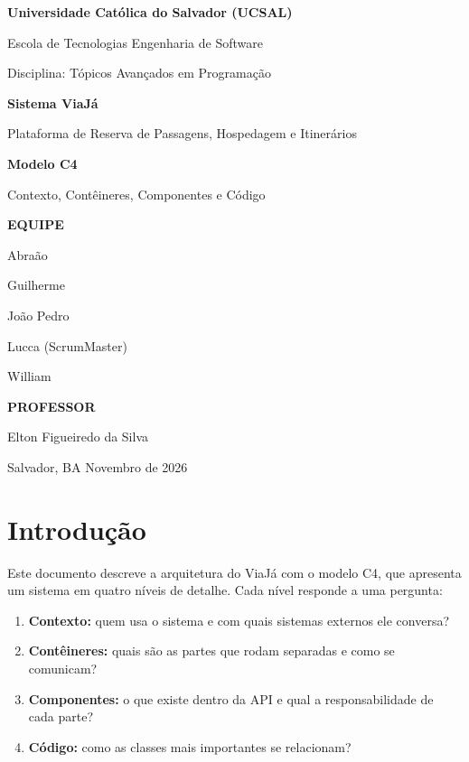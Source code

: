 \documentclass[12pt,a4paper]{article}
\begin{document}
\begin{titlepage}
    \centering
    {\large\bfseries\color{viaja} Universidade Católica do Salvador (UCSAL)\par}
    {\large\color{viaja} Escola de Tecnologias \textperiodcentered{} Engenharia de Software\par}
    \vspace{0.6cm}
    {\normalsize Disciplina: Tópicos Avançados em Programação\par}
    \vfill
    {\Huge\bfseries\color{viaja} Sistema ViaJá\par}
    \vspace{0.6cm}
    {\Large Plataforma de Reserva de Passagens, Hospedagem e Itinerários\par}
    \vspace{0.4cm}
    {\Large\bfseries Modelo C4\par}
    {\large Contexto, Contêineres, Componentes e Código\par}
    \vfill
    {\small\bfseries EQUIPE\par}
    \vspace{0.2cm}
    Abraão\par
    Guilherme\par
    João Pedro\par
    Lucca (ScrumMaster)\par
    William\par
    \vspace{0.6cm}
    {\small\bfseries PROFESSOR\par}
    \vspace{0.2cm}
    Elton Figueiredo da Silva\par
    \vfill
    Salvador, BA \textperiodcentered{} Novembro de 2026\par
\end{titlepage}

\tableofcontents
\newpage

\section{Introdução}

Este documento descreve a arquitetura do ViaJá com o modelo C4, que apresenta um sistema em quatro
níveis de detalhe. Cada nível responde a uma pergunta:

\begin{enumerate}[leftmargin=*]
    \item \textbf{Contexto:} quem usa o sistema e com quais sistemas externos ele conversa?
    \item \textbf{Contêineres:} quais são as partes que rodam separadas e como se comunicam?
    \item \textbf{Componentes:} o que existe dentro da API e qual a responsabilidade de cada parte?
    \item \textbf{Código:} como as classes mais importantes se relacionam?
\end{enumerate}
\end{document}
